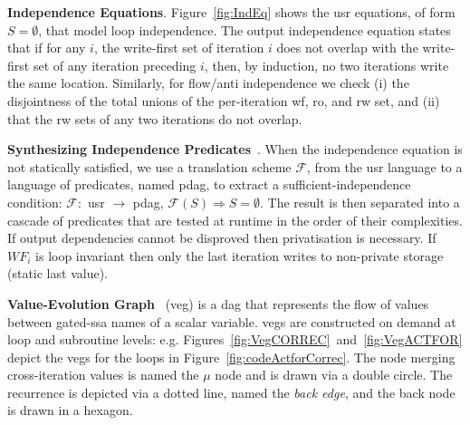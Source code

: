 \documentclass{sig-alternate}
\begin{document}
\vspace{1ex}

{\bf Independence Equations}. Figure~\ref{fig:IndEq} shows the {\sc usr}
equations, of form $S=\emptyset$, that model loop independence. 
The output independence equation
states that if for any $i$, the write-first set of iteration $i$
does not overlap with the write-first set of any iteration preceding
$i$, then, by induction, no two  iterations write the same %
location. Similarly, for flow/anti independence we check 
(i) the disjointness of the total unions of the per-iteration {\sc wf}, 
{\sc ro}, and {\sc rw} set, and (ii) that the {\sc rw} sets of any two 
iterations do not overlap.

\vspace{1ex}

{\bf Synthesizing Independence Predicates}~\cite{CosPLDI}. %
When the independence equation
is not statically satisfied, we use a translation scheme $\mathcal{F}$,
from the {\sc usr} language to a language of %
predicates, named {\sc pdag}, to extract a sufficient-independence condition: 
$\mathcal{F} : $ {\sc usr} $\rightarrow$ {\sc pdag},  
$\mathcal{F}(S) \Rightarrow S = \emptyset$. The result is then separated
into a cascade of predicates that are tested at runtime in the order of 
their complexities.  
If output dependencies cannot be disproved then privatisation is
necessary. If $WF_i$ is loop invariant then only the last iteration 
writes to non-private storage (static last value).

\vspace{1ex}

{\bf Value-Evolution Graph}~\cite{VEG} ({\sc veg}) is a {\sc dag}  %
that represents the flow of values between gated-{\sc ssa} names 
of a scalar variable.  
%
{\sc veg}s are constructed on demand at loop and subroutine levels: e.g. 
Figures~\ref{fig:VegCORREC}~and~\ref{fig:VegACTFOR} depict the 
{\sc veg}s for the loops in Figure~\ref{fig:codeActforCorrec}.
%
The node merging cross-iteration values  is named 
the $\mu$ node and is drawn via a double circle. The recurrence is 
depicted via a dotted line, named the {\em back edge}, and the
back node is drawn in a hexagon.

\enlargethispage{\baselineskip}
\end{document}
